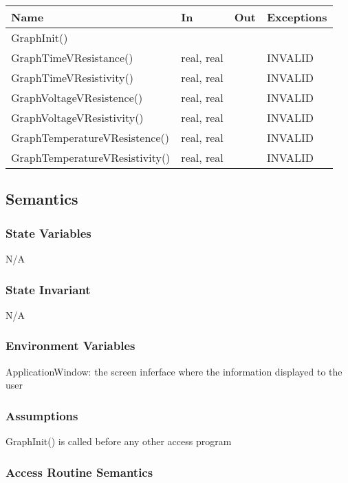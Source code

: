 \documentclass[12pt, titlepage]{article}
\begin{document}
\begin{center}
\begin{tabular}{p{6cm} p{2cm} p{2cm} p{3cm}}
\hline
\textbf{Name} & \textbf{In} & \textbf{Out} & \textbf{Exceptions} \\
\hline
GraphInit() & &  &  \\
GraphTimeVResistance() & real, real &  & INVALID \\
GraphTimeVResistivity() & real, real &  & INVALID \\
GraphVoltageVResistence() & real, real &  & INVALID \\
GraphVoltageVResistivity() & real, real &  & INVALID \\
GraphTemperatureVResistence() & real, real &  & INVALID \\
GraphTemperatureVResistivity() & real, real &  & INVALID \\
\hline
\end{tabular}
\end{center}

\subsection{Semantics}

\subsubsection{State Variables}

N/A

\subsubsection{State Invariant}

N/A
\subsubsection{Environment Variables}

ApplicationWindow: the screen inferface where the information displayed to the user

\subsubsection{Assumptions}

GraphInit() is called before any other access program

\subsubsection{Access Routine Semantics}
\end{document}
